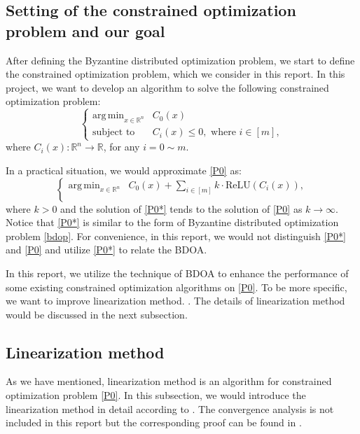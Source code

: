 \documentclass[conference]{IEEEtran}
\DeclareMathOperator*{\argmin}{arg\,min}
\begin{document}
\subsection{Setting of the constrained optimization problem and our goal}
After defining the Byzantine distributed optimization problem, we start to define the constrained optimization problem, which we consider in this report.
In this project, we want to develop an algorithm to solve the following constrained optimization problem:
\begin{equation*}
\tag{P0}
\begin{cases}
    \argmin_{x\in \mathbb{R}^n} &C_0(x)\\
    \text{subject to} &C_i(x) \leq 0, \text{ where } i \in [m],
\end{cases}
\label{P0}  
\end{equation*}
where $C_i(x):\mathbb{R}^n \rightarrow \mathbb{R}$, for any $i = 0\sim m$.

In a practical situation, we would approximate \eqref{P0} as:
\begin{equation*}
\tag{P0*}
\begin{cases}
    \argmin_{x\in \mathbb{R}^n} &C_0(x) + 
    \sum_{i \in [m]} k\cdot\text{ReLU}(C_i(x)),\\
\end{cases}
\label{P0*}  
\end{equation*}
where $k>0$ and the solution of \eqref{P0*} tends to the solution of \eqref{P0} as $k\rightarrow\infty$.
Notice that \eqref{P0*} is similar to the form of Byzantine distributed optimization problem \eqref{bdop}. For convenience, in this report, we would not distinguish \eqref{P0*} and \eqref{P0} and utilize \eqref{P0*} to relate the BDOA.

In this report, we utilize the technique of BDOA to enhance the performance of some existing constrained optimization algorithms on \eqref{P0}. To be more specific, we want to improve linearization method. \cite{wilson2012linearization}. The details of linearization method would be discussed in the next subsection.

\subsection{Linearization method}
As we have mentioned, linearization method is an algorithm for constrained optimization problem \eqref{P0}. In this subsection, we would introduce the linearization method in detail according to \cite{wilson2012linearization}. The convergence analysis is not included in this report but the corresponding proof can be found in \cite{wilson2012linearization}.
\end{document}
